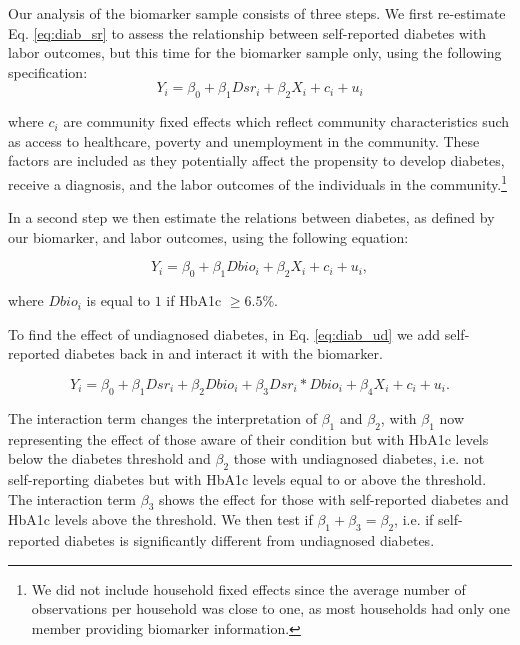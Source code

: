 \documentclass[12pt,english]{article}
\begin{document}
Our analysis of the biomarker sample consists of three steps. We first re-estimate Eq. \ref{eq:diab_sr} to assess the relationship between self-reported diabetes with labor outcomes, but this time for the biomarker sample only, using the following specification:
\begin{equation}
Y_{i}=\beta_{0}+\beta_{1}Dsr_{i}+\beta_{2}X_{i}+c_{i}+u_{i}\label{eq:diab_sr}
\end{equation}

where $c_{i}$ are community fixed effects which reflect community characteristics such as access to healthcare, poverty and unemployment in the community. These factors are included as they potentially affect the propensity to develop diabetes, receive a diagnosis, and the labor outcomes of the individuals in the community.\footnote{We did not include household fixed effects since the average number of observations per household was close to one, as most households had only one member providing biomarker information.}

In a second step we then estimate the relations between diabetes, as defined by our biomarker, and labor outcomes, using the following equation:

\begin{equation}
Y_{i}=\beta_{0}+\beta_{1}Dbio_{i}+\beta_{2}X_{i}+c_{i}+u_{i}\label{eq:diab},
\end{equation}

where $Dbio_{i}$ is equal to $1$ if \ac{HbA1c} $\geq6.5\%$. 

To find the effect of undiagnosed diabetes, in Eq. \ref{eq:diab_ud} we add self-reported diabetes back in and interact it with the biomarker.

\begin{equation}
Y_{i}=\beta_{0}+\beta_{1}Dsr_{i}+\beta_{2}Dbio_{i}+\beta_{3}Dsr_{i}*Dbio_{i}+\beta_{4}X_{i}+c_{i}+u_{i}.\label{eq:diab_ud}
\end{equation}

The interaction term changes the interpretation of $\beta_{1}$ and $\beta_{2}$, with $\beta_{1}$ now representing the effect of those aware of their condition but with \ac{HbA1c} levels below the diabetes threshold and $\beta_{2}$ those with undiagnosed diabetes, i.e. not self-reporting diabetes but with \ac{HbA1c} levels equal to or above the threshold. The interaction term $\beta_{3}$ shows the effect for those with self-reported diabetes and \ac{HbA1c} levels above the threshold. We then test if $\beta_{1} + \beta_{3} = \beta_{2}$, i.e. if self-reported diabetes is significantly different from undiagnosed diabetes.
\end{document}
